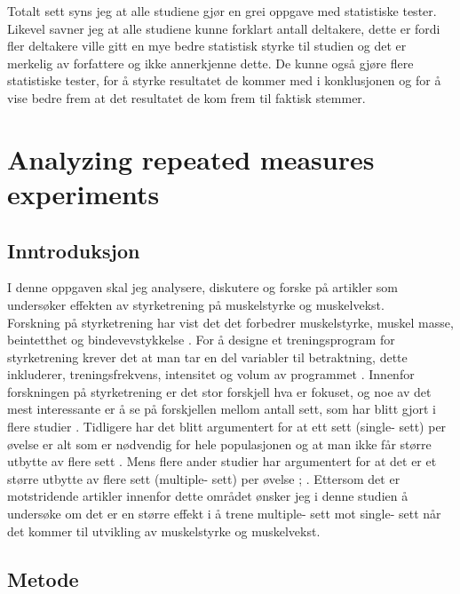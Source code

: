\documentclass[
]{book}
\begin{document}
Totalt sett syns jeg at alle studiene gjør en grei oppgave med statistiske tester. Likevel savner jeg at alle studiene kunne forklart antall deltakere, dette er fordi fler deltakere ville gitt en mye bedre statistisk styrke til studien og det er merkelig av forfattere og ikke annerkjenne dette. De kunne også gjøre flere statistiske tester, for å styrke resultatet de kommer med i konklusjonen og for å vise bedre frem at det resultatet de kom frem til faktisk stemmer.

\hypertarget{analyzing-repeated-measures-experiments}{%
\chapter{Analyzing repeated measures experiments}\label{analyzing-repeated-measures-experiments}}

\hypertarget{inntroduksjon-1}{%
\section{Inntroduksjon}\label{inntroduksjon-1}}

I denne oppgaven skal jeg analysere, diskutere og forske på artikler som undersøker effekten av styrketrening på muskelstyrke og muskelvekst.~~\\
Forskning på styrketrening har vist det det forbedrer muskelstyrke, muskel masse, beintetthet og bindevevstykkelse \citep{kraemer2002a}. For å designe et treningsprogram for styrketrening krever det at man tar en del variabler til betraktning, dette inkluderer, treningsfrekvens, intensitet og volum av programmet \citep{hass2001a}. Innenfor forskningen på styrketrening er det stor forskjell hva er fokuset, og noe av det mest interessante er å se på forskjellen mellom antall sett, som har blitt gjort i flere studier \citep{krieger2010a}. Tidligere har det blitt argumentert for at ett sett (single- sett) per øvelse er alt som er nødvendig for hele populasjonen og at man ikke får større utbytte av flere sett \citep{carpinelli1998c}. Mens flere ander studier har argumentert for at det er et større utbytte av flere sett (multiple- sett) per øvelse \citet{galvão2005a}; \citet{humburg2007e}. Ettersom det er motstridende artikler innenfor dette området ønsker jeg i denne studien å undersøke om det er en større effekt i å trene multiple- sett mot single- sett når det kommer til utvikling av muskelstyrke og muskelvekst.

\hypertarget{metode-2}{%
\section{Metode}\label{metode-2}}
\end{document}
